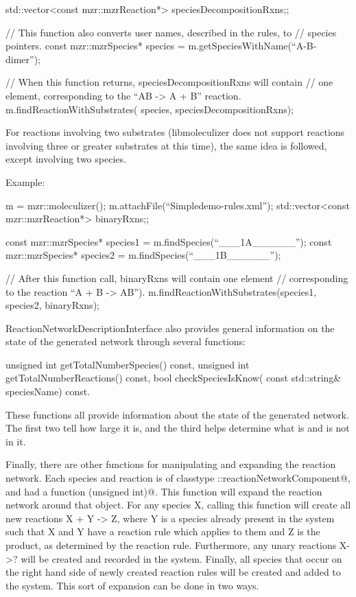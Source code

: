 std::vector<const mzr::mzrReaction*> speciesDecompositionRxns;;

// This function also converts user names, described in the rules, to
// species pointers.
const mzr::mzrSpecies* species = m.getSpeciesWithName(``A-B-dimer'');

// When this function returns, speciesDecompositionRxns will contain
// one element, corresponding to the ``AB -> A + B'' reaction.  
m.findReactionWithSubstrates( species, speciesDecompositionRxns);

For reactions involving two substrates (libmoleculizer does not
support reactions involving three or greater substrates at this time),
the same idea is followed, except involving two species.  

Example:
\begin{ExampleCPP}
m = mzr::moleculizer();
m.attachFile(``Simpledemo-rules.xml'');
std::vector<const mzr::mzrReaction*> binaryRxns;;

const mzr::mzrSpecies* species1 = m.findSpecies(``___1A______'');
const mzr::mzrSpecies* species2 = m.findSpecies(``___1B______'');

// After this function call, binaryRxns will contain one element
// corresponding to the reaction ``A + B -> AB'').
m.findReactionWithSubstrates(species1, species2, binaryRxns);


ReactionNetworkDescriptionInterface also provides general information
on the state of the generated network through several functions:

unsigned int getTotalNumberSpecies() const, 
unsigned int getTotalNumberReactions() const,
bool checkSpeciesIsKnow( const std::string& speciesName) const.
\end{ExampleCPP}

These functions all provide information about the state of the
generated network.  The first two tell how large it is, and the third
helps determine what is and is not in it.  

Finally, there are other functions for manipulating and expanding the
reaction network.  Each species and reaction is of classtype
\lstinline@fnd::reactionNetworkComponent@, and had a function
\lstinline@expandReactionNetwork(unsigned int)@.  This function will expand the
reaction network around that object.  For any species X, calling this
function will create all new reactions X + Y -> Z, where Y is a species
already present in the system such that X and Y have a reaction rule
which applies to them and Z is the product, as determined by the
reaction rule.  Furthermore, any unary reactions X->? will be created
and recorded in the system.  Finally, all species that occur on the
right hand side of newly created reaction rules will be created and
added to the system.  This sort of expansion can be done in two ways.

